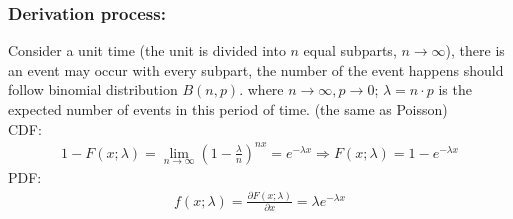 \documentclass[11pt,a4paper]{article}
\begin{document}
\subsubsection*{Derivation process:}

Consider a unit time (the unit is divided into $n$ equal subparts, $n \rightarrow \infty$), there is an event may occur with every subpart, the number of the event happens should follow binomial distribution $B(n,p)$. where $n \rightarrow \infty, p \rightarrow 0$; $\lambda=n\cdot p$ is the expected number of events in this period of time. (the same as Poisson)\\
CDF:
\begin{equation}
    \begin{aligned}
        1-F(x;\lambda)=\lim_{n \rightarrow \infty}(1-\frac{\lambda}{n})^{nx}=e^{-\lambda x}
        \Rightarrow F(x;\lambda)=1-e^{-\lambda x}
    \end{aligned}
    \nonumber
\end{equation}
PDF:
\begin{equation}
    \begin{aligned}
        f(x;\lambda)=\frac{\partial F(x;\lambda)}{\partial x}=\lambda e^{-\lambda x}
    \end{aligned}
    \nonumber
\end{equation}
\end{document}
